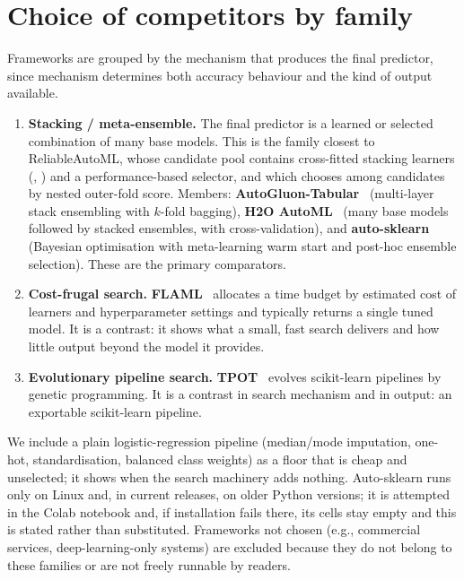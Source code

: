 \documentclass[conference]{IEEEtran}
\begin{document}
\section{Choice of competitors by family}
Frameworks are grouped by the mechanism that produces the final predictor, since mechanism determines both accuracy behaviour and the kind of output available.
\begin{enumerate}[label=(\alph*),leftmargin=*]
\item \textbf{Stacking / meta-ensemble.} The final predictor is a learned or selected combination of many base models. This is the family closest to ReliableAutoML, whose candidate pool contains cross-fitted stacking learners (, ) and a performance-based selector, and which chooses among candidates by nested outer-fold score. Members: \textbf{AutoGluon-Tabular}~\cite{erickson2020} (multi-layer stack ensembling with $k$-fold bagging), \textbf{H2O AutoML}~\cite{ledell2020} (many base models followed by stacked ensembles, with cross-validation), and \textbf{auto-sklearn}~\cite{feurer2015} (Bayesian optimisation with meta-learning warm start and post-hoc ensemble selection). These are the primary comparators.
\item \textbf{Cost-frugal search.} \textbf{FLAML}~\cite{wang2021} allocates a time budget by estimated cost of learners and hyperparameter settings and typically returns a single tuned model. It is a contrast: it shows what a small, fast search delivers and how little output beyond the model it provides.
\item \textbf{Evolutionary pipeline search.} \textbf{TPOT}~\cite{olson2016} evolves scikit-learn pipelines by genetic programming. It is a contrast in search mechanism and in output: an exportable scikit-learn pipeline.
\end{enumerate}
We include a plain logistic-regression pipeline (median/mode imputation, one-hot, standardisation, balanced class weights) as a floor that is cheap and unselected; it shows when the search machinery adds nothing. Auto-sklearn runs only on Linux and, in current releases, on older Python versions; it is attempted in the Colab notebook and, if installation fails there, its cells stay empty and this is stated rather than substituted. Frameworks not chosen (e.g., commercial services, deep-learning-only systems) are excluded because they do not belong to these families or are not freely runnable by readers.
\end{document}
